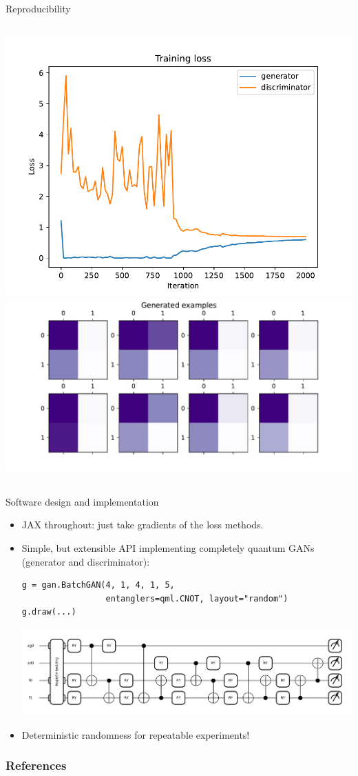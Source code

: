 \documentclass{beamer}
\begin{document}
\begin{frame}{Reproducibility}
\begin{columns}
\centering
    \includegraphics[width=0.95\linewidth]{figures/training_loss_2.pdf}
    \includegraphics[width=0.95\linewidth]{figures/examples_2.pdf}
\end{columns}

\end{frame}

\begin{frame}[fragile]{Software design and implementation}
\begin{itemize}
    \item JAX throughout: just take gradients of the loss methods.
    \item Simple, but extensible API implementing completely quantum GANs (generator and discriminator):
    \begin{verbatim}
g = gan.BatchGAN(4, 1, 4, 1, 5,
                 entanglers=qml.CNOT, layout="random")
g.draw(...)
    \end{verbatim}
    \begin{center}
        \includegraphics[width=0.9\linewidth]{figures/gates.pdf}
    \end{center}
    \item Deterministic randomness for repeatable experiments!
\end{itemize}
\end{frame}

\begin{frame}[allowframebreaks]
  \frametitle{References}
  \printbibliography
\end{frame}
\end{document}
